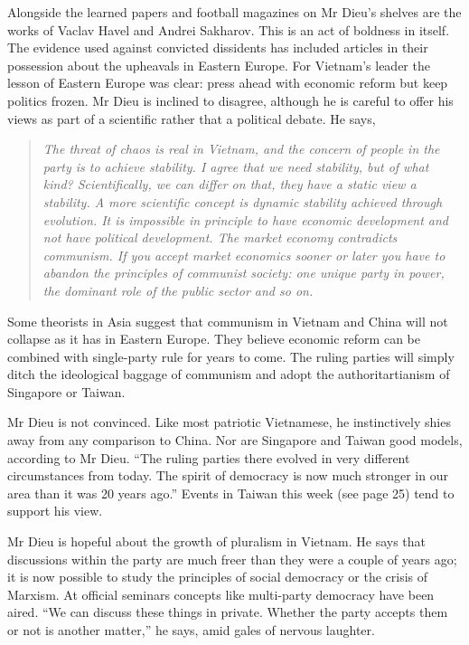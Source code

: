Alongside the learned papers and football magazines on Mr Dieu’s shelves are the works of Vaclav Havel and Andrei Sakharov. This is an act of boldness in itself. The evidence used against convicted dissidents has included articles in their possession about the upheavals in Eastern Europe. For Vietnam’s leader the lesson of Eastern Europe was clear: press ahead with economic reform but keep politics frozen. Mr Dieu is inclined to disagree, although he is careful to offer his views as part of a scientific rather that a political debate. He says, 
\begin{quote}
\textit{The threat of chaos is real in Vietnam, and the concern of people in the party is to achieve stability. I agree that we need stability, but of what kind? Scientifically, we can differ on that, they have a static view a stability. A more scientific concept is dynamic stability achieved through evolution. It is impossible in principle to have economic development and not have political development. The market economy contradicts communism. If you accept market economics sooner or later you have to abandon the principles of communist society: one unique party in power, the dominant role of the public sector and so on. }
\end{quote}

Some theorists in Asia suggest that communism in Vietnam and China will not collapse as it has in Eastern Europe. They believe economic reform can be combined with single-party rule for years to come. The ruling parties will simply ditch the ideological baggage of communism and adopt the authoritartianism of Singapore or Taiwan. 


Mr Dieu is not convinced. Like most patriotic Vietnamese, he instinctively shies away from any comparison to China. Nor are Singapore and Taiwan good models, according to Mr Dieu. “The ruling parties there evolved in very different circumstances from today. The spirit of democracy is now much stronger in our area than it was 20 years ago.” Events in Taiwan this week (see page 25) tend to support his view. 


Mr Dieu is hopeful about the growth of pluralism in Vietnam. He says that discussions within the party are much freer than they were a couple of years ago; it is now possible to study the principles of social democracy or the crisis of Marxism. At official seminars concepts like multi-party democracy have been aired. “We can discuss these things in private. Whether the party accepts them or not is another matter,” he says, amid gales of nervous laughter. 

